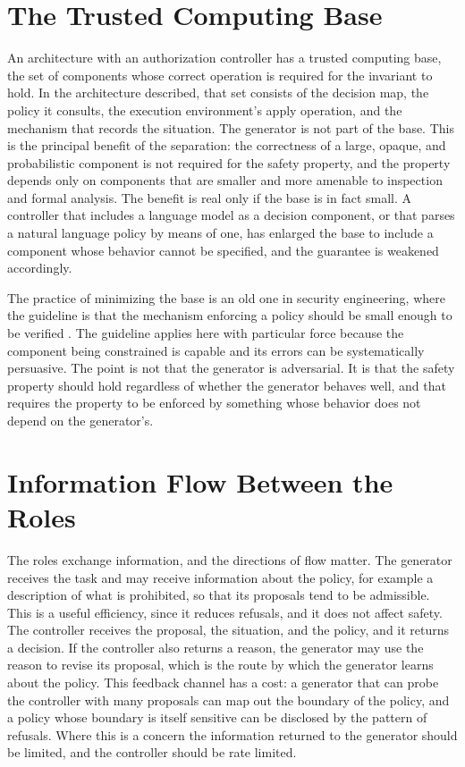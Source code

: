 \section{The Trusted Computing Base}

An architecture with an authorization controller has a trusted computing base, the set of components whose correct operation is required for the invariant to hold. In the architecture described, that set consists of the decision map, the policy it consults, the execution environment's apply operation, and the mechanism that records the situation. The generator is not part of the base. This is the principal benefit of the separation: the correctness of a large, opaque, and probabilistic component is not required for the safety property, and the property depends only on components that are smaller and more amenable to inspection and formal analysis. The benefit is real only if the base is in fact small. A controller that includes a language model as a decision component, or that parses a natural language policy by means of one, has enlarged the base to include a component whose behavior cannot be specified, and the guarantee is weakened accordingly.

The practice of minimizing the base is an old one in security engineering, where the guideline is that the mechanism enforcing a policy should be small enough to be verified \cite{saltzer1975}. The guideline applies here with particular force because the component being constrained is capable and its errors can be systematically persuasive. The point is not that the generator is adversarial. It is that the safety property should hold regardless of whether the generator behaves well, and that requires the property to be enforced by something whose behavior does not depend on the generator's.

\section{Information Flow Between the Roles}

The roles exchange information, and the directions of flow matter. The generator receives the task and may receive information about the policy, for example a description of what is prohibited, so that its proposals tend to be admissible. This is a useful efficiency, since it reduces refusals, and it does not affect safety. The controller receives the proposal, the situation, and the policy, and it returns a decision. If the controller also returns a reason, the generator may use the reason to revise its proposal, which is the route by which the generator learns about the policy. This feedback channel has a cost: a generator that can probe the controller with many proposals can map out the boundary of the policy, and a policy whose boundary is itself sensitive can be disclosed by the pattern of refusals. Where this is a concern the information returned to the generator should be limited, and the controller should be rate limited.

